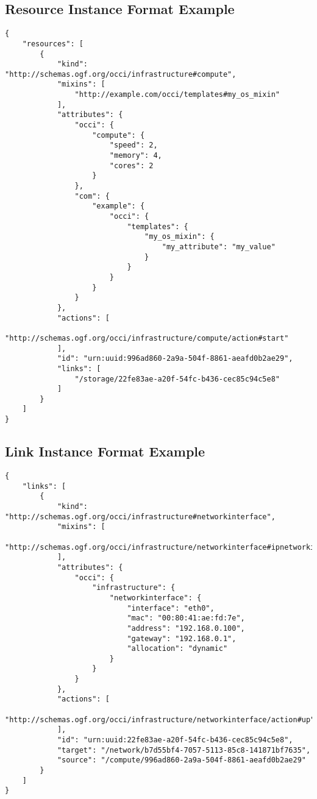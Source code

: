 \documentclass[10pt,a4paper]{article}
\begin{document}

\subsection{Resource Instance Format Example}
\label{sec:example_resource}

\begin{lstlisting}
{
    "resources": [
        {
            "kind": "http://schemas.ogf.org/occi/infrastructure#compute",
            "mixins": [
                "http://example.com/occi/templates#my_os_mixin"
            ],
            "attributes": {
                "occi": {
                    "compute": {
                        "speed": 2,
                        "memory": 4,
                        "cores": 2
                    }
                },
                "com": {
                    "example": {
                        "occi": {
                            "templates": {
                                "my_os_mixin": {
                                    "my_attribute": "my_value"
                                }
                            }
                        }
                    }
                }
            },
            "actions": [
                "http://schemas.ogf.org/occi/infrastructure/compute/action#start"
            ],
            "id": "urn:uuid:996ad860-2a9a-504f-8861-aeafd0b2ae29",
            "links": [
                "/storage/22fe83ae-a20f-54fc-b436-cec85c94c5e8"
            ]
        }
    ]
}
\end{lstlisting}

\subsection{Link Instance Format Example}
\label{sec:example_link}

\begin{lstlisting}
{
    "links": [
        {
            "kind": "http://schemas.ogf.org/occi/infrastructure#networkinterface",
            "mixins": [
                "http://schemas.ogf.org/occi/infrastructure/networkinterface#ipnetworkinterface"
            ],
            "attributes": {
                "occi": {
                    "infrastructure": {
                        "networkinterface": {
                            "interface": "eth0",
                            "mac": "00:80:41:ae:fd:7e",
                            "address": "192.168.0.100",
                            "gateway": "192.168.0.1",
                            "allocation": "dynamic"
                        }
                    }
                }
            },
            "actions": [
                "http://schemas.ogf.org/occi/infrastructure/networkinterface/action#up"
            ],
            "id": "urn:uuid:22fe83ae-a20f-54fc-b436-cec85c94c5e8",
            "target": "/network/b7d55bf4-7057-5113-85c8-141871bf7635",
            "source": "/compute/996ad860-2a9a-504f-8861-aeafd0b2ae29"
        }
    ]
}
\end{lstlisting}
\end{document}
